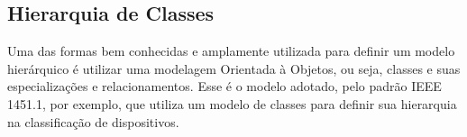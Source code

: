 \subsection{Hierarquia de Classes}
Uma das formas bem conhecidas e amplamente utilizada para definir um modelo hierárquico é utilizar uma modelagem Orientada à Objetos, ou seja, classes e suas especializações e relacionamentos. Esse é o modelo adotado, pelo padrão IEEE 1451.1, por exemplo, que utiliza um modelo de classes para definir sua hierarquia na classificação de dispositivos.